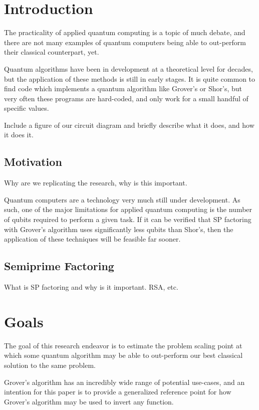 \documentclass[twocolumn]{cinc}
\begin{document}
\section{Introduction}

The practicality of applied quantum computing is a topic of much debate,
and there are not many examples of quantum computers being able to out-perform
their classical counterpart, yet.

Quantum algorithms have been in development at a theoretical level for
decades, but the application of these methods is still in early stages.
It is quite common to find code which implements a quantum algorithm like
Grover's or Shor's, but very often these programs are hard-coded, and only
work for a small handful of specific values\cite{shors_ibm}.

Include a figure of our circuit diagram and briefly describe what it 
does, and how it does it.

  \subsection{Motivation}

  Why are we replicating the research, why is this important.

  Quantum computers are a technology very much still under development. 
  As such, one of the major limitations for applied quantum computing is 
  the number of qubits required to perform a given task. If it can be verified 
  that SP factoring with Grover's algorithm uses significantly less qubits than
  Shor's, then the application of these techniques will be feasible far sooner.

  \subsection{Semiprime Factoring}  

  What is SP factoring and why is it important. RSA, etc.

\section{Goals}

The goal of this research endeavor is to estimate the problem scaling point
at which some quantum algorithm may be able to out-perform our best classical
solution to the same problem.

Grover's algorithm has an incredibly wide range of potential use-cases,
and an intention for this paper is to provide a generalized reference point
for how Grover's algorithm may be used to invert any function.
\end{document}
